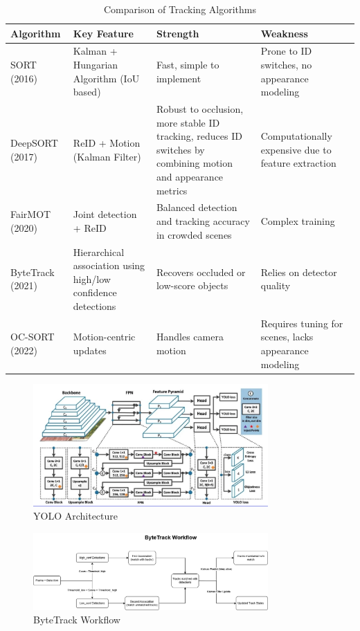 \documentclass[11pt]{article}
\begin{document}
\begin{table}[h]
    \centering
    \begin{tabular}{|p{1.8cm}|p{3.5cm}|p{4.1cm}|p{4.1cm}|}
        \hline
        \textbf{Algorithm} & \textbf{Key Feature} & \textbf{Strength} & \textbf{Weakness} \\
        \hline
        SORT (2016) & Kalman + Hungarian Algorithm (IoU based) & Fast, simple to implement & Prone to ID switches, no appearance modeling \\
        \hline
        DeepSORT (2017) & ReID + Motion (Kalman Filter) & Robust to occlusion, more stable ID tracking, reduces ID switches by combining motion and appearance metrics & Computationally expensive due to feature extraction \\
        \hline
        FairMOT (2020) & Joint detection + ReID & Balanced detection and tracking accuracy in crowded scenes & Complex training \\
        \hline
        ByteTrack (2021) & Hierarchical association using high/low confidence detections & Recovers occluded or low-score objects & Relies on detector quality \\
        \hline
        OC-SORT (2022) & Motion-centric updates & Handles camera motion & Requires tuning for scenes, lacks appearance modeling \\
        \hline
    \end{tabular}
\label{tab:tracking_algorithms}
\caption{Comparison of Tracking Algorithms}
\end{table}
\newpage

\begin{figure}[h]
    \centering
    \includegraphics[width=0.8\textwidth]{figs/yolo-arch.png}
    \caption{YOLO Architecture}
    \label{fig:yolo_architecture}
\end{figure}

\begin{figure}[h]
    \centering
    \includegraphics[width=0.8\textwidth]{figs/bytetrack-workflow.png}
    \caption{ByteTrack Workflow}
    \label{fig:byetrack_workflow}
\end{figure}
\end{document}
